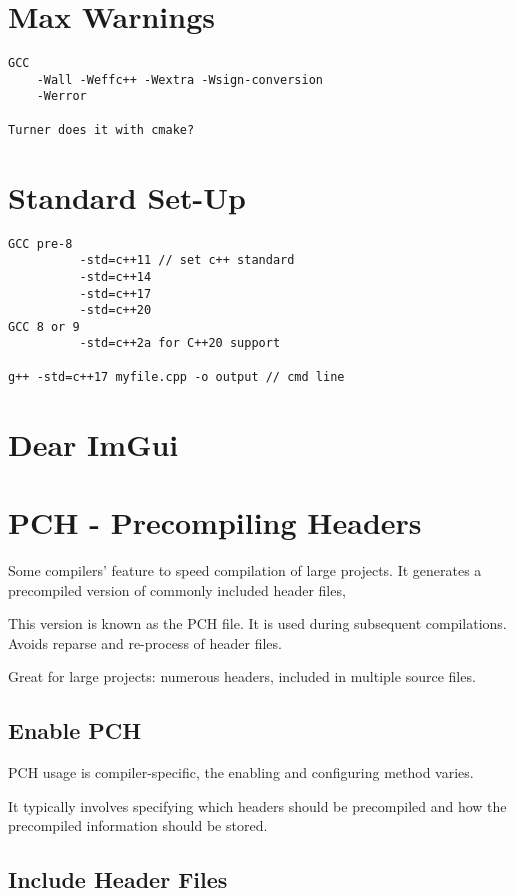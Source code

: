 \documentclass[openany]{report}
\begin{document}
\section{Max Warnings}

\begin{verbatim}
GCC 
    -Wall -Weffc++ -Wextra -Wsign-conversion
    -Werror

Turner does it with cmake?
\end{verbatim}

\section{Standard Set-Up}

\begin{verbatim}
GCC pre-8
          -std=c++11 // set c++ standard
          -std=c++14
          -std=c++17
          -std=c++20 
GCC 8 or 9
          -std=c++2a for C++20 support

g++ -std=c++17 myfile.cpp -o output // cmd line
\end{verbatim}

\section{Dear ImGui}

\section{PCH - Precompiling Headers}

Some compilers' feature to speed compilation of large projects. 
It generates a precompiled version of commonly included header files, 

This version is known as the PCH file.
It is used during subsequent compilations. Avoids reparse and re-process of header files.

Great for large projects: numerous headers, included in multiple source files.

\subsection{Enable PCH}

PCH usage is compiler-specific, the enabling and configuring method varies. 

It typically involves specifying which headers should be precompiled and how the precompiled information should be stored.

\subsection{Include Header Files}
\end{document}
